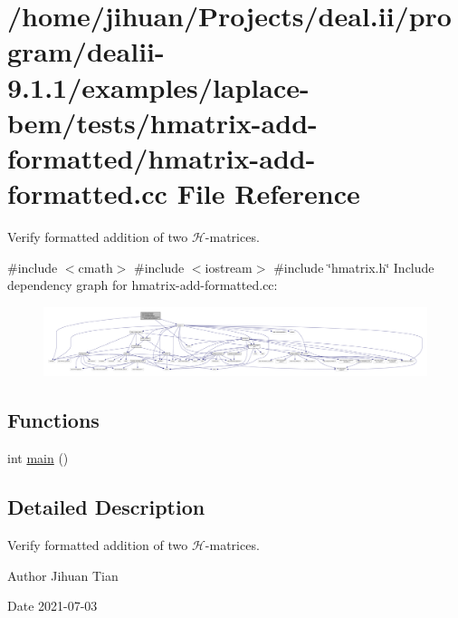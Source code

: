 \hypertarget{hmatrix-add-formatted_8cc}{}\section{/home/jihuan/\+Projects/deal.ii/program/dealii-\/9.1.1/examples/laplace-\/bem/tests/hmatrix-\/add-\/formatted/hmatrix-\/add-\/formatted.cc File Reference}
\label{hmatrix-add-formatted_8cc}


Verify formatted addition of two $\mathcal{H}$-\/matrices.  


{\ttfamily \#include $<$cmath$>$}\newline
{\ttfamily \#include $<$iostream$>$}\newline
{\ttfamily \#include \char`\"{}hmatrix.\+h\char`\"{}}\newline
Include dependency graph for hmatrix-\/add-\/formatted.cc\+:
\nopagebreak
\begin{figure}[H]
\begin{center}
\leavevmode
\includegraphics[width=350pt]{hmatrix-add-formatted_8cc__incl}
\end{center}
\end{figure}
\subsection*{Functions}
\begin{DoxyCompactItemize}
\item 
int \hyperlink{hmatrix-add-formatted_8cc_ae66f6b31b5ad750f1fe042a706a4e3d4}{main} ()
\end{DoxyCompactItemize}


\subsection{Detailed Description}
Verify formatted addition of two $\mathcal{H}$-\/matrices. 

\begin{DoxyAuthor}{Author}
Jihuan Tian 
\end{DoxyAuthor}
\begin{DoxyDate}{Date}
2021-\/07-\/03 
\end{DoxyDate}



